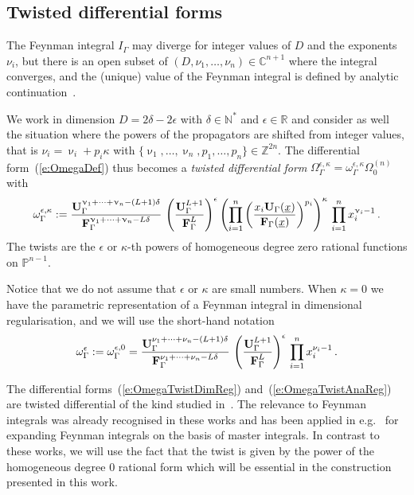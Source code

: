 \documentclass[a4paper,12pt]{article}
\numberwithin{equation}{section}
\numberwithin{figure}{section}
\begin{document}
\subsection{Twisted differential forms}\label{sec:Twisted}

The Feynman integral $I_\Gamma$ may diverge  for integer values of $D$ and 
the exponents $\nu_i$, but there is an open subset of
$(D,\nu_1,\dots,\nu_n)\in\mathbb C^{n+1}$ where  the integral
converges,  and the (unique) value of the Feynman integral is  defined by analytic continuation~\cite{Speer}.


We work in dimension $D=2\delta-2\epsilon$ with $\delta\in\mathbb N^*$ and
$\epsilon\in\mathbb R$ and  consider as well the situation where the powers of the propagators are shifted from integer values, that is  $\nu_i=\upnu_i
+ p_i \kappa$ with $\{\upnu_1,\dots,\upnu_n,p_1,\dots,p_n\}\in\mathbb Z^{2n}$. The 
differential form~(\ref{e:OmegaDef}) thus becomes a \emph{twisted
	differential form}  $\Omega^{\epsilon,\kappa}_\Gamma
=\omega^{\epsilon,\kappa}_\Gamma \Omega_0^{(n)}$ with
\begin{equation}\label{e:OmegaTwistAnaReg}
	\omega^{\epsilon,\kappa}_\Gamma := { \textbf{U}_\Gamma
		^{\upnu_1+\cdots+\upnu_n-(L+1)\delta}  \over \textbf{F}_\Gamma
		^{\upnu_1+\cdots+\upnu_n-L\delta}
	}\,\left(\textbf{U}_\Gamma^{L+1}\over \textbf{F}_\Gamma^L\right)^\epsilon
	\left(\prod_{i=1}^n \left(x_i \textbf{U}_\Gamma(\underline x)\over
	\textbf{F}_\Gamma(\underline x)\right)^{p_i}\right)^{\kappa} \, \prod_{i=1}^n x_i^{\upnu_i-1} \,.
\end{equation}
%
The twists are the $\epsilon$ or $\kappa$-th powers of  homogeneous
degree zero rational functions on $\mathbb
P^{n-1}$.


Notice that we do not assume that $\epsilon$ or $\kappa$ are small numbers.
When $\kappa=0$ we have the parametric representation of a Feynman
integral in dimensional regularisation, and we will use the short-hand
notation 
\begin{equation}\label{e:OmegaTwistDimReg}
\omega^\epsilon_\Gamma:=\omega^{\epsilon,0}_\Gamma = { \textbf{U}_\Gamma ^{\nu_1+\cdots+\nu_n-(L+1)\delta}  \over \textbf{F}_\Gamma ^{\nu_1+\cdots+\nu_n-L\delta} }\,
	\left(\textbf{U}_\Gamma^{L+1}\over \textbf{F}_\Gamma^{L}\right)^{\epsilon} \, \prod_{i=1}^n x_i^{\nu_i-1} \, .
\end{equation}
%

\medskip

The differential forms~(\ref{e:OmegaTwistDimReg})
and~(\ref{e:OmegaTwistAnaReg}) are twisted differential of the kind
studied in~\cite{Aomoto1,Aomoto,Aomoto_1982,AomotoBook}.
The relevance to Feynman integrals was already recognised in these works and has
been applied in
e.g.~\cite{Mizera:2017rqa,Frellesvig:2019uqt,Cacciatori:2021nli,Munch:2023ifm,Brunello:2023rpq,Teschke:2024bct}  for
expanding Feynman integrals on the basis of master integrals. In contrast to these works, 
%
we will use
the fact that the twist is given by
the power of the homogeneous degree 0 rational form
which will be essential
in the construction presented in this work.
\end{document}
